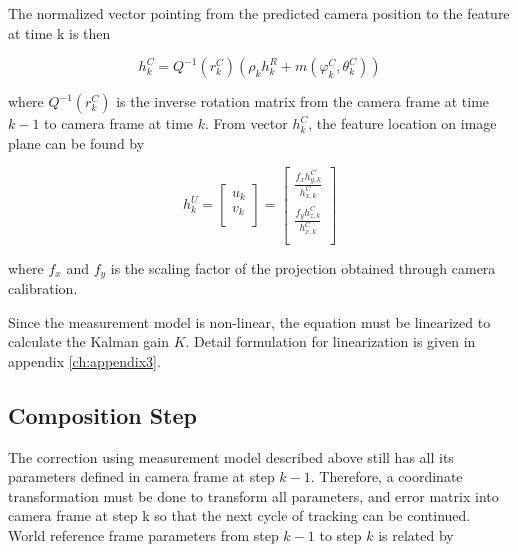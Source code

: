The normalized vector pointing from the predicted camera position to the 
feature at time k is then 

\begin{equation}
  h_{k}^{C}=Q^{-1}\left(r_{k}^{C}\right)\left(\rho _{k}h_{k}^{R}+m\left(\varphi_{ 
        k}^{C},\theta _{k}^{C}\right)\right)
\end{equation}

\noindent where $Q^{-1}(r_{k}^{C})$ is the inverse rotation matrix from the 
camera frame at time $k-1$ to camera frame at time $k$. From vector 
$h_{k}^{C}$, the feature location on image plane can be found by

\begin{equation}
h_{k}^{U}= \begin{bmatrix}
u_{k} \\
v_{k} \\
\end{bmatrix}=\begin{bmatrix}
\frac{f_{x}h_{y,k}^{C}}{h_{x,k}^{C}} \\
\frac{f_{y}h_{z,k}^{C}}{h_{x,k}^{C}} \\
\end{bmatrix}
\end{equation}

\noindent where $f_{x}$ and $f_{y}$ is the scaling factor of the projection 
obtained through camera calibration.

Since the measurement model is non-linear, the equation must be
linearized to calculate the Kalman gain $K$. Detail formulation for
linearization is given in appendix \ref{ch:appendix3}.

\subsection{Composition Step}

The correction using measurement model described above still has all
its parameters defined in camera frame at step $k-1$. Therefore, a
coordinate transformation must be done to transform all parameters,
and error matrix into camera frame at step k so that the next cycle of
tracking can be continued. World reference frame parameters from step
$k-1$ to step $k$ is related by

